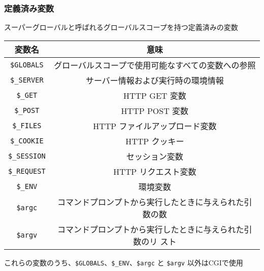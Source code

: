 \documentclass[dvipsk]{beamer}
\begin{document}
\begin{frame}[containsverbatim]
\frametitle{定義済み変数}
スーパーグローバルと呼ばれるグローバルスコープを持つ定義済みの変数
\begin{center}\small
 \begin{tabular}{|c|c|}\hline
  変数名& 意味\\\hline
\verb+$GLOBALS+ & グローバルスコープで使用可能なすべての変数への参照\\\hline
\verb+$_SERVER+ & サーバー情報および実行時の環境情報\\\hline
\verb+$_GET+ & HTTP GET 変数\\\hline
\verb+$_POST+ & HTTP POST 変数\\\hline
\verb+$_FILES+ & HTTP ファイルアップロード変数\\\hline
\verb+$_COOKIE+ & HTTP クッキー\\\hline
\verb+$_SESSION+ &セッション変数 \\\hline
\verb+$_REQUEST+ & HTTP リクエスト変数\\\hline
\verb+$_ENV+  &  環境変数\\\hline
\verb+$argc+  &  コマンドプロンプトから実行したときに与えられた引数の数\\\hline
\verb+$argv+  &  コマンドプロンプトから実行したときに与えられた引数のリ
      スト\\\hline
\end{tabular}
\end{center}
これらの変数のうち、\verb+$GLOBALS+、\verb+$_ENV+、\verb+$argc+ と
\verb+$argv+  以外はCGIで使用
\end{frame}
\end{document}
